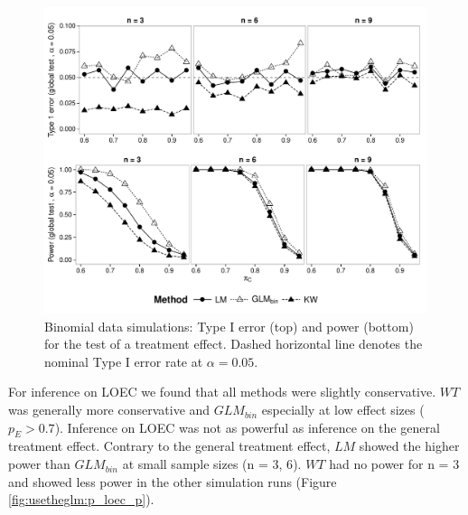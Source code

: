 \begin{figure}
  \centering
  \includegraphics[width = \textwidth]{chapters/usetheglm/p_glob_p.pdf}
  \caption[Binomial data simulations: 
  Type I error and  power for the test of a treatment effect.]{
  Binomial data simulations: Type I error (top) and  power (bottom) for the test of a treatment effect. 
  Dashed horizontal line denotes the nominal Type I error rate at $\alpha = 0.05$.
  }
  \label{fig:usetheglm:p_glob_p}
\end{figure}

For inference on LOEC we found that all methods were slightly conservative.
$WT$ was generally more conservative and $GLM_{bin}$ especially at low effect sizes ($p_E > 0.7$).
Inference on LOEC was not as powerful as inference on the general treatment effect.
Contrary to the general treatment effect, $LM$ showed the higher power than $GLM_{bin}$ at small sample sizes (n = {3, 6}).
$WT$ had no power for n = 3 and showed less power in the other simulation runs (Figure \ref{fig:usetheglm:p_loec_p}).

